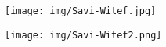 \begin{figure}[h]
	\centering
	\texttt{[image: img/Savi-Witef.jpg]}
	\label{fig:anexo8}\\
\end{figure}

\newpage

\begin{figure}[h]
	\centering
	\texttt{[image: img/Savi-Witef2.png]}
	\label{fig:anexo9}\\
\end{figure}
